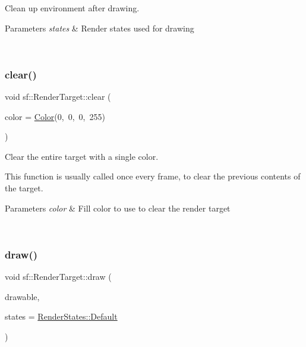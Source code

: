 Clean up environment after drawing. 


\begin{DoxyParams}{Parameters}
{\em states} & Render states used for drawing \begin{DoxyVerb}\end{DoxyVerb}
 \\
\hline
\end{DoxyParams}
\mbox{\label{classsf_1_1_render_target_a6bb6f0ba348f2b1e2f46114aeaf60f26}} 
\subsubsection{\texorpdfstring{clear()}{clear()}}
{\footnotesize\ttfamily void sf\+::\+Render\+Target\+::clear (\begin{DoxyParamCaption}\item[{const \mbox{\hyperlink{classsf_1_1_color}{Color}} \&}]{color = {\ttfamily \mbox{\hyperlink{classsf_1_1_color}{Color}}(0,~0,~0,~255)} }\end{DoxyParamCaption})}



Clear the entire target with a single color. 

This function is usually called once every frame, to clear the previous contents of the target.


\begin{DoxyParams}{Parameters}
{\em color} & Fill color to use to clear the render target \begin{DoxyVerb}\end{DoxyVerb}
 \\
\hline
\end{DoxyParams}
\mbox{\label{classsf_1_1_render_target_a12417a3bcc245c41d957b29583556f39}} 
\subsubsection{\texorpdfstring{draw()}{draw()}\hspace{0.1cm}{\footnotesize\ttfamily [1/4]}}
{\footnotesize\ttfamily void sf\+::\+Render\+Target\+::draw (\begin{DoxyParamCaption}\item[{const \mbox{\hyperlink{classsf_1_1_drawable}{Drawable}} \&}]{drawable,  }\item[{const \mbox{\hyperlink{classsf_1_1_render_states}{Render\+States}} \&}]{states = {\ttfamily \mbox{\hyperlink{classsf_1_1_render_states_ad29672df29f19ce50c3021d95f2bb062}{Render\+States\+::\+Default}}} }\end{DoxyParamCaption})}



